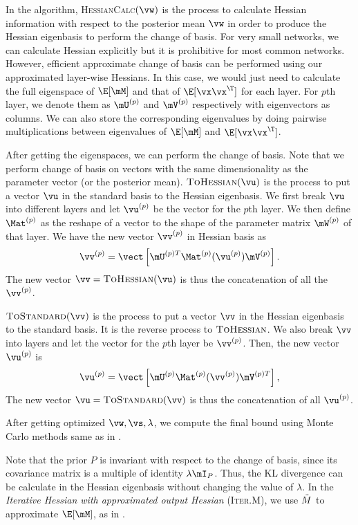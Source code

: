 In the algorithm, \textsc{HessianCalc}$(\vw)$ is the process to calculate Hessian information with respect to the posterior mean $\vw$ in order to produce the Hessian eigenbasis to perform the change of basis. For very small networks, we can calculate Hessian explicitly but it is prohibitive for most common networks. However, efficient approximate change of basis can be performed using our approximated layer-wise Hessians. In this case, we would just need to calculate the full eigenspace of $\E[\mM]$ and that of $\E[\vx\vx^\T]$ for each layer. For $p$th layer, we denote them as $\mU^{(p)}$ and $\mV^{(p)}$ respectively with eigenvectors as columns. We can also store the corresponding eigenvalues by doing pairwise multiplications between eigenvalues of $\E[\mM]$ and $\E[\vx\vx^\T]$.

After getting the eigenspaces, we can perform the change of basis. Note that we perform change of basis on vectors with the same dimensionality as the parameter vector (or the posterior mean). $\textsc{ToHessian}(\vu)$ is the process to put a vector $\vu$ in the standard basis to the Hessian eigenbasis. We first break $\vu$ into different layers and let $\vu^{(p)}$ be the vector for the $p$th layer. We then define $\Mat^{(p)}$ as the reshape of a vector to the shape of the parameter matrix $\mW^{(p)}$ of that layer. We have the new vector $\vv^{(p)}$ in Hessian basis as
\begin{equation}
\label{eqn:appendix_pacbayes_changebasis}
    \vv^{(p)} = \vect\left[\mU^{(p)T}\Mat^{(p)}(\vu^{(p)})\mV^{(p)}\right].
\end{equation}
The new vector $\vv = \textsc{ToHessian}(\vu)$ is thus the concatenation of all the $\vv^{(p)}$.

$\textsc{ToStandard}(\vv)$ is the process to put a vector $\vv$ in the Hessian eigenbasis to the standard basis. It is the reverse process to $\textsc{ToHessian}$. We also break $\vv$ into layers and let the vector for the $p$th layer be $\vv^{(p)}$. Then, the new vector $\vu^{(p)}$ is
\begin{equation}
    \vu^{(p)} = \vect\left[\mU^{(p)}\Mat^{(p)}(\vv^{(p)})\mV^{(p)T}\right],
\end{equation}
The new vector $\vu = \textsc{ToStandard}(\vv)$ is thus the concatenation of all $\vu^{(p)}$.

After getting optimized $\vw, \vs, \lambda$, we compute the final bound using Monte Carlo methods same as in \citet{dziugaite2017computing}.

Note that the prior $P$ is invariant with respect to the change of basis, since its covariance matrix is a multiple of identity $\lambda\mI_P$. Thus, the KL divergence can be calculate in the Hessian eigenbasis without changing the value of $\lambda$. In the \emph{Iterative Hessian with approximated output Hessian} (\textsc{Iter.M}), we use $\Tilde{M}$ to approximate $\E[\mM]$, as in .

